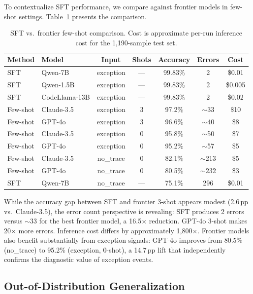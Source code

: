 \documentclass[11pt,a4paper]{article}
\newcommand{\pp}{\,pp}
\begin{document}
To contextualize SFT performance, we compare against frontier models in few-shot settings. Table~\ref{tab:frontier} presents the comparison.

\begin{table}[t]
\centering
\caption{SFT vs.\ frontier few-shot comparison. Cost is approximate per-run inference cost for the 1,190-sample test set.}
\label{tab:frontier}
\small
\begin{tabular}{@{}llccccc@{}}
\toprule
Method & Model & Input & Shots & Accuracy & Errors & Cost \\
\midrule
SFT & Qwen-7B        & exception & --- & 99.83\% & 2    & \$0.01 \\
SFT & Qwen-1.5B      & exception & --- & 99.83\% & 2    & \$0.005 \\
SFT & CodeLlama-13B  & exception & --- & 99.83\% & 2    & \$0.02 \\
\midrule
Few-shot & Claude-3.5 & exception & 3   & 97.2\%  & $\sim$33 & \$10 \\
Few-shot & GPT-4o     & exception & 3   & 96.6\%  & $\sim$40 & \$8 \\
Few-shot & Claude-3.5 & exception & 0   & 95.8\%  & $\sim$50 & \$7 \\
Few-shot & GPT-4o     & exception & 0   & 95.2\%  & $\sim$57 & \$5 \\
\midrule
Few-shot & Claude-3.5 & no\_trace & 0   & 82.1\%  & $\sim$213 & \$5 \\
Few-shot & GPT-4o     & no\_trace & 0   & 80.5\%  & $\sim$232 & \$3 \\
SFT      & Qwen-7B    & no\_trace & --- & 75.1\%  & 296  & \$0.01 \\
\bottomrule
\end{tabular}
\end{table}

While the accuracy gap between SFT and frontier 3-shot appears modest (2.6\pp{} vs.\ Claude-3.5), the error count perspective is revealing: SFT produces 2 errors versus $\sim$33 for the best frontier model, a 16.5$\times$ reduction. GPT-4o 3-shot makes 20$\times$ more errors. Inference cost differs by approximately 1,800$\times$. Frontier models also benefit substantially from exception signals: GPT-4o improves from 80.5\% (no\_trace) to 95.2\% (exception, 0-shot), a 14.7\pp{} lift that independently confirms the diagnostic value of exception events.

\subsection{Out-of-Distribution Generalization}
\label{sec:ood}
\end{document}
